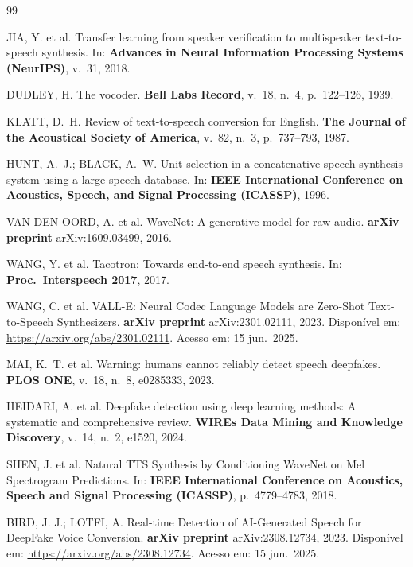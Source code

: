 \documentclass[12pt,a4paper]{article}
\begin{document}
\begin{thebibliography}{99}

JIA, Y. et al.
Transfer learning from speaker verification to multispeaker text-to-speech
synthesis.
In: \textbf{Advances in Neural Information Processing Systems (NeurIPS)},
v.~31, 2018.

DUDLEY, H.
The vocoder.
\textbf{Bell Labs Record},
v.~18, n.~4, p.~122--126, 1939.

KLATT, D.~H.
Review of text-to-speech conversion for English.
\textbf{The Journal of the Acoustical Society of America},
v.~82, n.~3, p.~737--793, 1987.

HUNT, A.~J.; BLACK, A.~W.
Unit selection in a concatenative speech synthesis system using a large
speech database.
In: \textbf{IEEE International Conference on Acoustics, Speech, and Signal
Processing (ICASSP)}, 1996.

VAN DEN OORD, A. et al.
WaveNet: A generative model for raw audio.
\textbf{arXiv preprint} arXiv:1609.03499, 2016.

WANG, Y. et al.
Tacotron: Towards end-to-end speech synthesis.
In: \textbf{Proc.\ Interspeech 2017}, 2017.

WANG, C. et al.
VALL-E: Neural Codec Language Models are Zero-Shot Text-to-Speech Synthesizers.
\textbf{arXiv preprint} arXiv:2301.02111, 2023.
Disponível em: \url{https://arxiv.org/abs/2301.02111}.
Acesso em: 15 jun.\ 2025.

MAI, K.~T. et al.
Warning: humans cannot reliably detect speech deepfakes.
\textbf{PLOS ONE},
v.~18, n.~8, e0285333, 2023.

HEIDARI, A. et al.
Deepfake detection using deep learning methods: A systematic and comprehensive
review.
\textbf{WIREs Data Mining and Knowledge Discovery},
v.~14, n.~2, e1520, 2024.

SHEN, J. et al.
Natural TTS Synthesis by Conditioning WaveNet on Mel Spectrogram Predictions.
In: \textbf{IEEE International Conference on Acoustics, Speech and Signal
Processing (ICASSP)}, p.~4779--4783, 2018.

BIRD, J. J.; LOTFI, A.
Real-time Detection of AI-Generated Speech for DeepFake Voice Conversion.
\textbf{arXiv preprint} arXiv:2308.12734, 2023.
Disponível em: \url{https://arxiv.org/abs/2308.12734}.
Acesso em: 15 jun.\ 2025.


\end{thebibliography}
\end{document}
